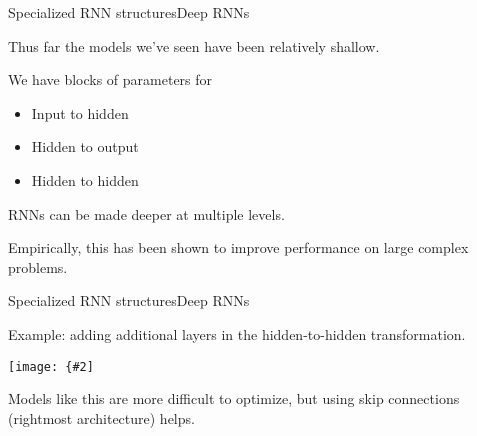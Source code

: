 \documentclass{beamer}
\newcommand{\myfig}[3]{\centerline{\texttt{[image: \{\#2]}}}
    \centerline{\scriptsize #3}}
\begin{document}
\begin{frame}{Specialized RNN structures}{Deep RNNs}
    
  Thus far the models we've seen have been relatively \alert{shallow}.

  \medskip
  
  We have blocks of parameters for
  \begin{itemize}
  \item Input to hidden
  \item Hidden to output
  \item Hidden to hidden
  \end{itemize}

  \medskip
  
  RNNs can be made deeper at multiple levels.

  \medskip
  
  Empirically, this has been shown to improve performance on large complex
  problems.

\end{frame}


\begin{frame}{Specialized RNN structures}{Deep RNNs}
    
  Example: adding additional layers in the hidden-to-hidden transformation.

  \medskip
  
  \myfig{2.0in}{goodfellow-fig10-13}{Goodfellow, Bengio, and Courville (2016), Fig.\ 10.13}

  \medskip
  
  Models like this are more difficult to optimize, but using skip
  connections (rightmost architecture) helps.
  
\end{frame}
\end{document}
